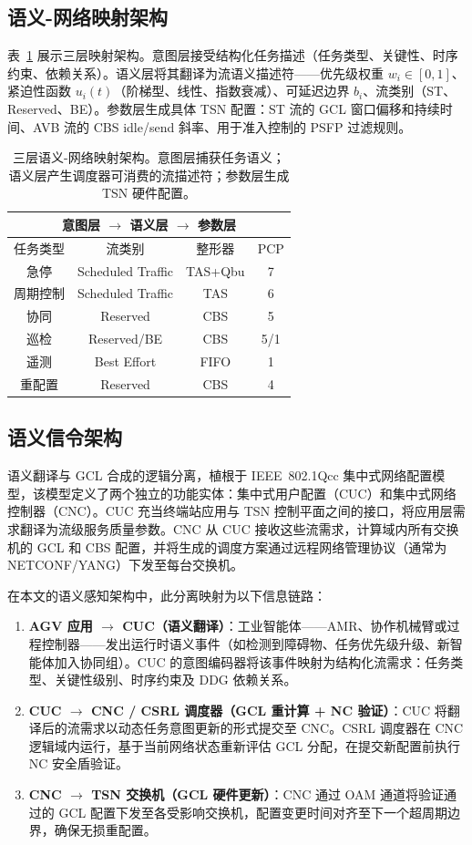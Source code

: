\documentclass[UTF8]{ctexart}
\begin{document}
\subsection{语义-网络映射架构}

表~\ref{tab:arch} 展示三层映射架构。意图层接受结构化任务描述（任务类型、关键性、时序约束、依赖关系）。语义层将其翻译为流语义描述符——优先级权重 $w_i \in [0,1]$、紧迫性函数 $u_i(t)$（阶梯型、线性、指数衰减）、可延迟边界 $b_i$、流类别（ST、Reserved、BE）。参数层生成具体 TSN 配置：ST 流的 GCL 窗口偏移和持续时间、AVB 流的 CBS idle/send 斜率、用于准入控制的 PSFP 过滤规则。

\begin{table}[t]
\centering
\caption{三层语义-网络映射架构。意图层捕获任务语义；语义层产生调度器可消费的流描述符；参数层生成 TSN 硬件配置。}
\label{tab:arch}
\begin{tabular}{|c|c|c|c|}
\hline
\multicolumn{4}{|c|}{\textbf{意图层} $\rightarrow$ \textbf{语义层} $\rightarrow$ \textbf{参数层}} \\
\hline
任务类型 & 流类别 & 整形器 & PCP \\
\hline
急停 & Scheduled Traffic & TAS+Qbu & 7 \\
周期控制 & Scheduled Traffic & TAS & 6 \\
协同 & Reserved & CBS & 5 \\
巡检 & Reserved/BE & CBS & 5/1 \\
遥测 & Best Effort & FIFO & 1 \\
重配置 & Reserved & CBS & 4 \\
\hline
\end{tabular}
\end{table}

\subsection{语义信令架构}

语义翻译与 GCL 合成的逻辑分离，植根于 IEEE~802.1Qcc 集中式网络配置模型，该模型定义了两个独立的功能实体：集中式用户配置（CUC）和集中式网络控制器（CNC）。CUC 充当终端站应用与 TSN 控制平面之间的接口，将应用层需求翻译为流级服务质量参数。CNC 从 CUC 接收这些流需求，计算域内所有交换机的 GCL 和 CBS 配置，并将生成的调度方案通过远程网络管理协议（通常为 NETCONF/YANG）下发至每台交换机。

在本文的语义感知架构中，此分离映射为以下信息链路：
\begin{enumerate}
\item \textbf{AGV 应用 $\rightarrow$ CUC（语义翻译）}：工业智能体——AMR、协作机械臂或过程控制器——发出运行时语义事件（如检测到障碍物、任务优先级升级、新智能体加入协同组）。CUC 的意图编码器将该事件映射为结构化流需求：任务类型、关键性级别、时序约束及 DDG 依赖关系。
\item \textbf{CUC $\rightarrow$ CNC / CSRL 调度器（GCL 重计算 + NC 验证）}：CUC 将翻译后的流需求以动态任务意图更新的形式提交至 CNC。CSRL 调度器在 CNC 逻辑域内运行，基于当前网络状态重新评估 GCL 分配，在提交新配置前执行 NC 安全盾验证。
\item \textbf{CNC $\rightarrow$ TSN 交换机（GCL 硬件更新）}：CNC 通过 OAM 通道将验证通过的 GCL 配置下发至各受影响交换机，配置变更时间对齐至下一个超周期边界，确保无损重配置。
\end{enumerate}
\end{document}
